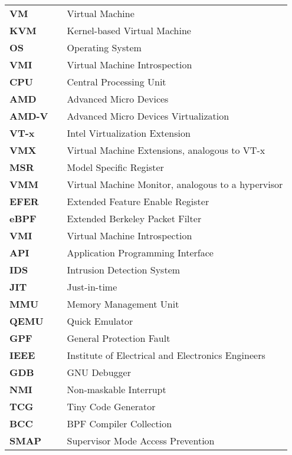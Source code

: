 \documentclass{report}
\begin{document}
\begin{spacing}{1.5}
\begin{longtable}{lcl}
\large{\bf VM}  & & \large{Virtual Machine} \\
\large{\bf KVM}  & & \large{Kernel-based Virtual Machine} \\
\large{\bf OS}   & & \large{Operating System}        \\
\large{\bf VMI}  & & \large{Virtual Machine Introspection} \\
\large{\bf CPU}  & & \large{Central Processing Unit} \\
\large{\bf AMD}  & & \large{Advanced Micro Devices} \\
\large{\bf AMD-V}  & & \large{Advanced Micro Devices Virtualization} \\
\large{\bf VT-x}  & & \large{Intel Virtualization Extension} \\
\large{\bf VMX}  & & \large{Virtual Machine Extensions, analogous to VT-x} \\
\large{\bf MSR}  & & \large{Model Specific Register} \\
\large{\bf VMM}  & & \large{Virtual Machine Monitor, analogous to a hypervisor} \\
\large{\bf EFER}  & & \large{Extended Feature Enable Register} \\
\large{\bf eBPF}  & & \large{Extended Berkeley Packet Filter} \\
\large{\bf VMI}  & & \large{Virtual Machine Introspection} \\
\large{\bf API}  & & \large{Application Programming Interface} \\
\large{\bf IDS}  & & \large{Intrusion Detection System} \\
\large{\bf JIT}  & & \large{Just-in-time} \\
\large{\bf MMU}  & & \large{Memory Management Unit} \\
\large{\bf QEMU}  & & \large{Quick Emulator} \\
\large{\bf GPF}  & & \large{General Protection Fault} \\
\large{\bf IEEE}  & & \large{Institute of Electrical and Electronics Engineers} \\
\large{\bf GDB}  & & \large{GNU Debugger} \\
\large{\bf NMI}  & & \large{Non-maskable Interrupt} \\
\large{\bf TCG}  & & \large{Tiny Code Generator} \\
\large{\bf BCC}  & & \large{BPF Compiler Collection} \\
\large{\bf SMAP}  & & \large{Supervisor Mode Access Prevention} \\

\end{longtable}
\end{spacing}
\end{document}
